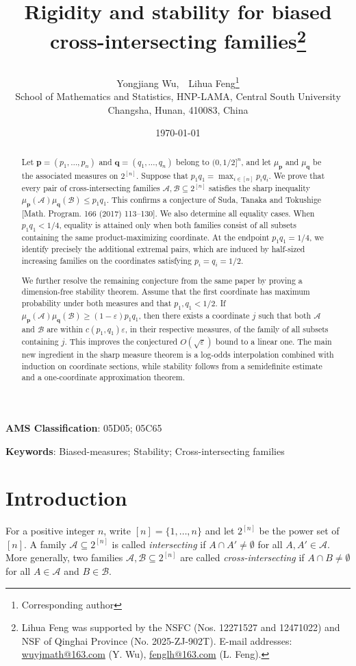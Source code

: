 \documentclass[11pt]{article}
\title{\bf \Large }
\date{\today }
\title{{\bf \Large 
Rigidity and stability for biased cross-intersecting families}\footnote{ Lihua Feng was supported by the NSFC (Nos. 12271527 and 12471022) and NSF of Qinghai Province (No. 2025-ZJ-902T). E-mail addresses: \url{wuyjmath@163.com} (Y. Wu), \url{fenglh@163.com} (L. Feng). }
\author{
{\small  Yongjiang Wu,\ \ Lihua Feng\footnote{Corresponding author}
}\\[2mm]
\small School of Mathematics and Statistics, HNP-LAMA, Central South University\\
 \small Changsha, Hunan, 410083, China\\ 
}}
\numberwithin{equation}{section}
\theoremstyle{definition}
\theoremstyle{remark}
\begin{document}
\maketitle
\begin{abstract}
Let $\mathbf p=(p_1,\ldots,p_n)$ and $\mathbf q=(q_1,\ldots,q_n)$ belong to $(0,1/2]^n$, and let $\mu_{\mathbf p}$ and $\mu_{\mathbf q}$ be the associated measures on $2^{[n]}$. Suppose that $p_1q_1=\max_{i\in[n]}p_iq_i$. We prove that every pair of cross-intersecting families $\mathcal A,\mathcal B\subseteq2^{[n]}$ satisfies the sharp inequality $\mu_{\mathbf p}(\mathcal A)\mu_{\mathbf q}(\mathcal B)\leq p_1q_1$. This  confirms a  conjecture of Suda, Tanaka and Tokushige [Math. Program. 166 (2017) 113--130]. We also determine all equality cases. When $p_1q_1<1/4$, equality is attained only when both families consist of all subsets containing the same product-maximizing coordinate. At the endpoint $p_1q_1=1/4$, we identify precisely the additional extremal pairs, which are induced by half-sized increasing families on the coordinates satisfying $p_i=q_i=1/2$.

We further resolve the remaining conjecture from the same paper by proving a dimension-free stability theorem. Assume that the first coordinate has maximum probability under both measures and that $p_1,q_1<1/2$. If $\mu_{\mathbf p}(\mathcal A)\mu_{\mathbf q}(\mathcal B)\geq(1-\varepsilon)p_1q_1$, then there exists a coordinate $j$ such that both $\mathcal A$ and $\mathcal B$ are within $c(p_1,q_1)\varepsilon$, in their respective measures, of the family of all subsets containing $j$. This improves the conjectured $O(\sqrt{\varepsilon})$ bound to a linear one. The main new ingredient in the sharp measure theorem is a log-odds interpolation combined with induction on coordinate sections, while stability follows from a semidefinite estimate and a one-coordinate approximation theorem.
\end{abstract}


{\bf AMS Classification}:  05D05; 05C65 

{\bf Keywords}: Biased-measures;  Stability; Cross-intersecting families

\tableofcontents
\section{Introduction}
\label{sec:introduction}

 For a positive integer $n$, write $[n]=\{1,\ldots,n\}$ and  let $2^{[n]}$ be the power set of $[n]$. A family $\mathcal{A}\subseteq 2^{[n]}$ is called \textit{intersecting} if $A\cap A'\neq\emptyset$ for all $A,A'\in\mathcal{A}$. More generally, two families $\mathcal{A},\mathcal{B}\subseteq 2^{[n]}$ are called \textit{cross-intersecting} if
$
 A\cap B\neq\emptyset
$
for all $A\in\mathcal{A}$ and $B\in\mathcal{B}$.
\end{document}
